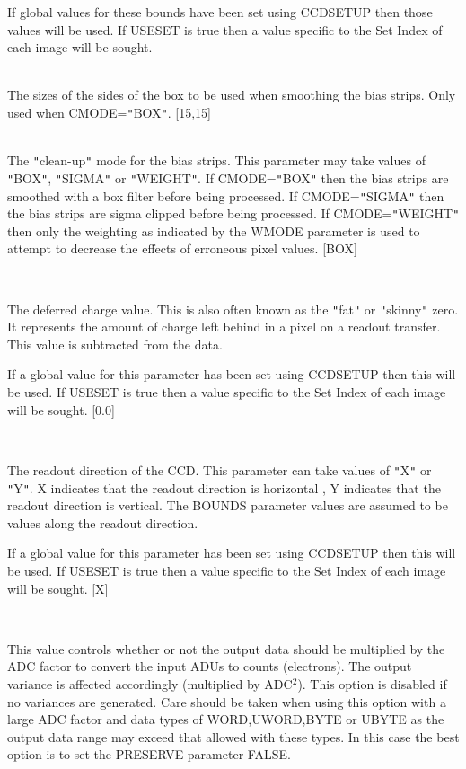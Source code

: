 \documentclass[twoside,11pt]{article}
\renewcommand{\_}{\texttt{\symbol{95}}}
\newcommand{\qt}[1]{{\tt "}#1{\tt "}}
\newcommand{\routine}[1]{{\sc #1}}
\newcommand{\sstsubsection}[1]{ \item[{#1}] \mbox{} \\}
\newcommand{\sstsubsection}[1]{\item[{#1}]}
\begin{document}
{{{         If global values for these bounds have been set using
         \routine{CCDSETUP} then those values will be used.   If USESET is true
         then a value specific to the Set Index of each image will
         be sought.
      }
      \sstsubsection{
         BOXSIZE( 2 ) = \_INTEGER (Read)
      } {
         The sizes of the sides of the box to be used when smoothing the
         bias strips. Only used when CMODE=\qt{BOX}.
         [15,15]
      }
      \sstsubsection{
         CMODE = LITERAL (Read)
      } {
         The \qt{clean-up} mode for the bias strips. This parameter may
         take values of \qt{BOX}, \qt{SIGMA} or \qt{WEIGHT}.
         If CMODE=\qt{BOX} then
         the bias strips are smoothed with a box filter before being
         processed. If CMODE=\qt{SIGMA} then the bias strips are sigma
         clipped before being processed. If CMODE=\qt{WEIGHT} then only
         the weighting as indicated by the WMODE parameter is used to
         attempt to decrease the effects of erroneous pixel values.
         [BOX]
      }
      \sstsubsection{
         DEFERRED = \_DOUBLE (Read)
      } {
         The deferred charge value. This is also often known as the
         \qt{fat} or \qt{skinny} zero. It represents the amount of charge
         left behind in a pixel on a readout transfer. This value is
         subtracted from the data.

         If a global value for this parameter has been set using
         \routine{CCDSETUP} then this will be used.    If USESET is true then a
         value specific to the Set Index of each image will be sought.
         [0.0]
      }
      \sstsubsection{
         DIRECTION = LITERAL (Read)
      } {
         The readout direction of the CCD. This parameter can take
         values of \qt{X} or \qt{Y}. X indicates that the readout direction is
         horizontal , Y indicates that the readout direction is
         vertical. The BOUNDS parameter values are assumed to be values
         along the readout direction.

         If a global value for this parameter has been set using
         \routine{CCDSETUP} then this will be used.  If USESET is true then a
         value specific to the Set Index of each image will be sought.
         [X]
      }
      \sstsubsection{
         EXPAND = \_LOGICAL (Read)
      } {
         This value controls whether or not the output data should be
         multiplied by the ADC factor to convert the input ADUs to
         counts (electrons).  The output variance is affected accordingly
         (multiplied by ADC$^2$).  This option is disabled if no variances
         are generated. Care should be taken when using this option
         with a large ADC factor and data types of \_WORD,\_UWORD,\_BYTE
         or \_UBYTE as the output data range may exceed that allowed
         with these types. In this case the best option is to set
         the PRESERVE parameter FALSE.

}}}
\end{document}
